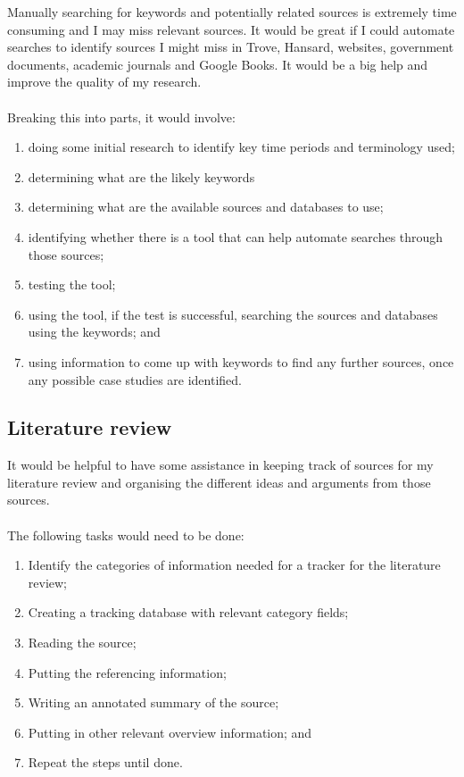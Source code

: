 \documentclass{article}
\begin{document}
Manually searching for keywords and potentially related sources is extremely time consuming and I may miss relevant sources.  It would be great if I could automate searches to identify sources I might miss in Trove, Hansard, websites, government documents, academic journals and Google Books. It would be a big help and improve the quality of my research.\\\\
Breaking this into parts, it would involve:
\begin{enumerate}
    \item doing some initial research to identify key time periods and terminology used;
    \item determining what are the likely keywords
    \item determining what are the available sources and databases to use;
    \item identifying whether there is a tool that can help automate searches through those sources;
    \item testing the tool;
    \item using the tool, if the test is successful, searching the sources and databases using the keywords; and
    \item using information to come up with keywords to find any further sources, once any possible case studies are identified.
\end{enumerate}

\subsection*{Literature review}

It would be helpful to have some assistance in keeping track of sources for my literature review and organising the different ideas and arguments from those sources.\\\\
The following tasks would need to be done:
\begin{enumerate}
    \item Identify the categories of  information needed for a tracker for the literature review;
\item Creating a tracking database with relevant category fields;
\item Reading the source;
\item Putting the referencing information;
\item Writing an annotated summary of the source;
\item Putting in other relevant overview information; and
\item Repeat the steps until done.
\end{enumerate}
\end{document}
